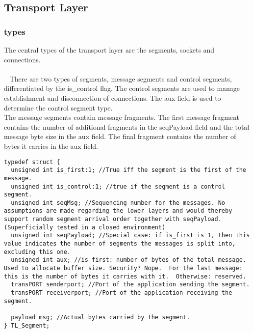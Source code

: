\subsection{Transport Layer}
\subsubsection{types}
The central types of the transport layer are the segments, sockets and connections.\\
\\~
There are two types of segments, message segments and control segments, differentiated by the is\_control flag. The control segments are used to manage establishment and disconnection of connections. The aux field is used to determine the control segment type.\\
The message segments contain message fragments. The first message fragment contains the number of additional fragments in the seqPayload field and the total message byte size in the aux field. The final fragment contains the number of bytes it carries in the aux field.

\begin{lstlisting}
typedef struct {
  unsigned int is_first:1; //True iff the segment is the first of the message.
  unsigned int is_control:1; //true if the segment is a control segment.
  unsigned int seqMsg; //Sequencing number for the messages. No assumptions are made regarding the lower layers and would thereby support random segment arrival order together with seqPayload. (Superficially tested in a closed environment)
  unsigned int seqPayload; //Special case: if is_first is 1, then this value indicates the number of segments the messages is split into, excluding this one.
  unsigned int aux; //is_first: number of bytes of the total message. Used to allocate buffer size. Security? Nope.  For the last message: this is the number of bytes it carries with it.  Otherwise: reserved.
  transPORT senderport; //Port of the application sending the segment.
  transPORT receiverport; //Port of the application receiving the segment.

  payload msg; //Actual bytes carried by the segment.
} TL_Segment;
\end{lstlisting}

